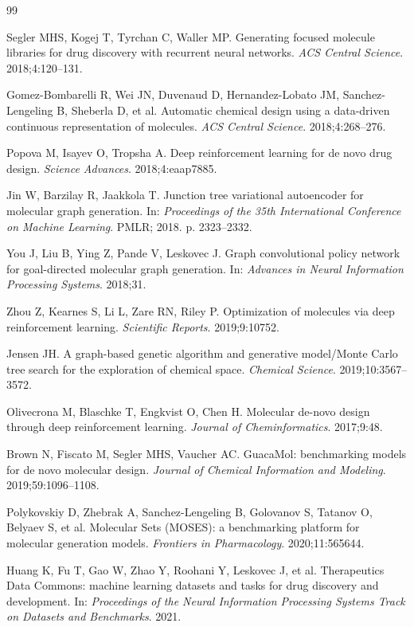 \documentclass[referee,lineno,pdflatex,sn-basic]{sn-jnl}
\theoremstyle{thmstyleone}%
\theoremstyle{thmstyletwo}%
\theoremstyle{thmstylethree}%
\begin{document}
\begin{thebibliography}{99}

Segler MHS, Kogej T, Tyrchan C, Waller MP.
Generating focused molecule libraries for drug discovery with recurrent neural networks.
\textit{ACS Central Science}. 2018;4:120--131.

Gomez-Bombarelli R, Wei JN, Duvenaud D, Hernandez-Lobato JM, Sanchez-Lengeling B, Sheberla D, et al.
Automatic chemical design using a data-driven continuous representation of molecules.
\textit{ACS Central Science}. 2018;4:268--276.

Popova M, Isayev O, Tropsha A.
Deep reinforcement learning for de novo drug design.
\textit{Science Advances}. 2018;4:eaap7885.

Jin W, Barzilay R, Jaakkola T.
Junction tree variational autoencoder for molecular graph generation.
In: \textit{Proceedings of the 35th International Conference on Machine Learning}. PMLR; 2018. p. 2323--2332.

You J, Liu B, Ying Z, Pande V, Leskovec J.
Graph convolutional policy network for goal-directed molecular graph generation.
In: \textit{Advances in Neural Information Processing Systems}. 2018;31.

Zhou Z, Kearnes S, Li L, Zare RN, Riley P.
Optimization of molecules via deep reinforcement learning.
\textit{Scientific Reports}. 2019;9:10752.

Jensen JH.
A graph-based genetic algorithm and generative model/Monte Carlo tree search for the exploration of chemical space.
\textit{Chemical Science}. 2019;10:3567--3572.

Olivecrona M, Blaschke T, Engkvist O, Chen H.
Molecular de-novo design through deep reinforcement learning.
\textit{Journal of Cheminformatics}. 2017;9:48.

Brown N, Fiscato M, Segler MHS, Vaucher AC.
GuacaMol: benchmarking models for de novo molecular design.
\textit{Journal of Chemical Information and Modeling}. 2019;59:1096--1108.

Polykovskiy D, Zhebrak A, Sanchez-Lengeling B, Golovanov S, Tatanov O, Belyaev S, et al.
Molecular Sets (MOSES): a benchmarking platform for molecular generation models.
\textit{Frontiers in Pharmacology}. 2020;11:565644.

Huang K, Fu T, Gao W, Zhao Y, Roohani Y, Leskovec J, et al.
Therapeutics Data Commons: machine learning datasets and tasks for drug discovery and development.
In: \textit{Proceedings of the Neural Information Processing Systems Track on Datasets and Benchmarks}. 2021.


\end{thebibliography}
\end{document}
